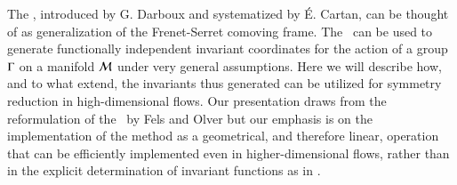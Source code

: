 
The \mframes, introduced by G. Darboux and systematized by \'E. Cartan,
can be thought of as generalization of the Frenet-Serret comoving frame.
The \mframes\ can be used to generate functionally independent invariant coordinates
for the action of a group $\Gamma$ on a manifold ${\cal M}$ under
very general assumptions.  Here we will describe how, and to what extend,
the invariants thus generated can be utilized for symmetry reduction in
high-dimensional flows. Our presentation draws from the reformulation of the \mframes\
by Fels and Olver but our emphasis is on the implementation
of the method as a geometrical, and therefore linear, operation that can be efficiently
implemented even in higher-dimensional flows, rather than in the explicit
determination of invariant functions as in .

